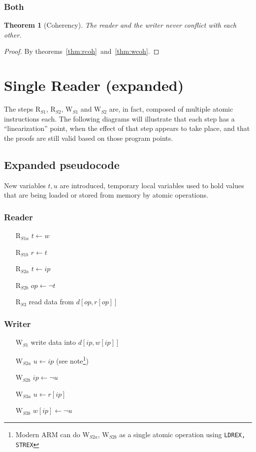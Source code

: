 \documentclass{article}
\newtheorem{thm}{Theorem}
\newcommand\RS[1]{\ensuremath{\text{R}_{S#1}}}
\newcommand\WS[1]{\ensuremath{\text{W}_{S#1}}}
\newcommand\W[1]{\ensuremath{w\left[#1\right]}}
\newcommand\R[1]{\ensuremath{r\left[#1\right]}}
\newcommand\data[1]{\ensuremath{d\left[#1\right]}}
\newcommand\ip{\ensuremath{ip}}
\newcommand\op{\ensuremath{op}}
\begin{document}
\subsubsection{Both}
\begin{thm}[Coherency]
  The reader and the writer never conflict with each other.
\end{thm}
\begin{proof}
  By theorems~\ref{thm:rcoh}~and~\ref{thm:wcoh}.
\end{proof}


\section{Single Reader (expanded)}

The steps \RS1, \RS2, \WS1 and \WS2 are, in fact, composed of multiple
atomic instructions each. The following diagrams will illustrate that
each step has a ``linearization'' point, when the effect of that step
appears to take place, and that the proofs are still valid based on
those program points.

\subsection{Expanded pseudocode}
New variables $t,u$ are introduced, temporary local variables used to
hold values that are being loaded or stored from memory by atomic
operations.
\subsubsection{Reader}
\begin{itemize}
\item[\RS {1a}] $t\gets w$
\item[\RS {1b}] $r\gets t$
\item[\RS {2a}] $t\gets\ip$
\item[\RS {2b}] $\op\gets\neg t$
\item[\RS 3] read data from $\data{\op,\R{\op}}$
\end{itemize}

\subsubsection{Writer}
\begin{itemize}
\item[\WS 1] write data into $\data{\ip,\W{\ip}}$
\item[\WS {2a}] $u\gets\ip$ (see note\footnote{Modern ARM can do \WS{2a}, \WS{2b} as a single atomic operation using {\tt LDREX, STREX}})
\item[\WS {2b}] $\ip\gets\neg u$
\item[\WS {3a}] $u\gets\R{\ip}$
\item[\WS {3b}] $\W{\ip}\gets\neg u$
\end{itemize}
\end{document}
